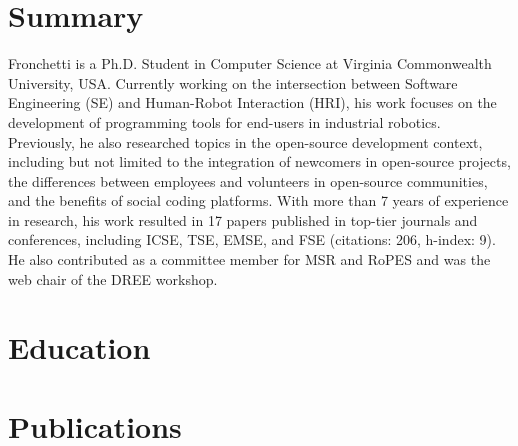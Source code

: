 \documentclass[10pt]{extarticle}
\begin{document}
\createHeader

\section{Summary}
\small Fronchetti is a Ph.D. Student in Computer Science at Virginia Commonwealth University, USA. Currently working on the intersection between Software Engineering (SE) and Human-Robot Interaction (HRI), his work focuses on the development of programming tools for end-users in industrial robotics. Previously, he also researched topics in the open-source development context, including but not limited to the integration of newcomers in open-source projects, the differences between employees and volunteers in open-source communities, and the benefits of social coding platforms. With more than 7 years of experience in research, his work resulted in 17 papers published in top-tier journals and conferences, including ICSE, TSE, EMSE, and FSE (citations: 206, h-index: 9). He also contributed as a committee member for MSR and RoPES and was the web chair of the DREE workshop.

\section{Education}
%
%
%

\section{Publications}
\end{document}
